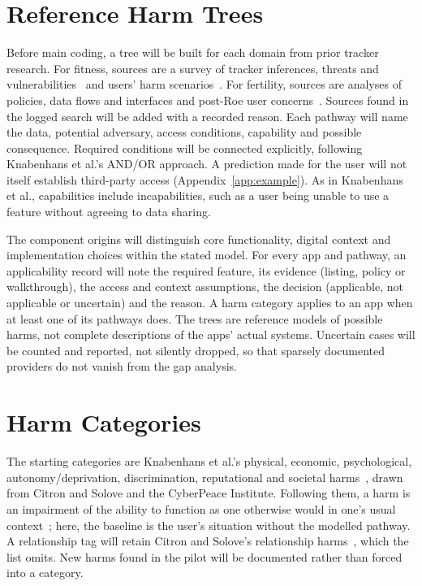 \section{Reference Harm Trees} Before main coding, a tree will be built for
each domain from prior tracker research. For fitness, sources are a survey of
tracker inferences, threats and vulnerabilities~\parencite{niksirat2024wearable}
and users' harm scenarios~\parencite{gabriele2020understanding}. For fertility,
sources are analyses of policies, data flows and interfaces
\parencite{shipp2020period,malki2024exploring,hudig2025intimate} and post-Roe
user concerns~\parencite{cao2024deleted}. Sources found in the logged search
will be added with a recorded reason. Each pathway will name the data, potential
adversary, access conditions, capability and possible consequence. Required
conditions will be connected explicitly, following Knabenhans et al.'s
AND/OR approach. A prediction made for the user will not itself establish
third-party access (Appendix~\ref{app:example}). As in Knabenhans et al., capabilities include incapabilities, such as a user
being unable to use a feature without agreeing to data sharing.

The component origins will distinguish core functionality, digital context
and implementation choices within the stated model. For every app and
pathway, an applicability record will note the required feature, its
evidence (listing, policy or walkthrough), the access and context
assumptions, the decision (applicable, not applicable or uncertain) and the
reason. A harm category applies to an app when at least one of its pathways
does. The trees are reference models of possible harms, not complete
descriptions of the apps' actual systems. Uncertain cases will be counted and
reported, not silently dropped, so that sparsely documented providers do not
vanish from the gap analysis.

\section{Harm Categories} The starting categories are Knabenhans et al.'s
physical, economic, psychological, autonomy/\allowbreak deprivation, discrimination,
reputational and societal harms~\parencite[App.~A]{knabenhans2026harms},
drawn from Citron and Solove and the CyberPeace Institute. Following them, a
harm is an impairment of the ability to function as one otherwise would in
one's usual context~\parencite[\S4.1]{knabenhans2026harms}; here, the baseline
is the user's situation without the modelled pathway. A relationship tag will
retain Citron and Solove's relationship harms~\parencite{citron2021harms},
which the list omits. New harms found in the pilot will be documented rather
than forced into a category.


